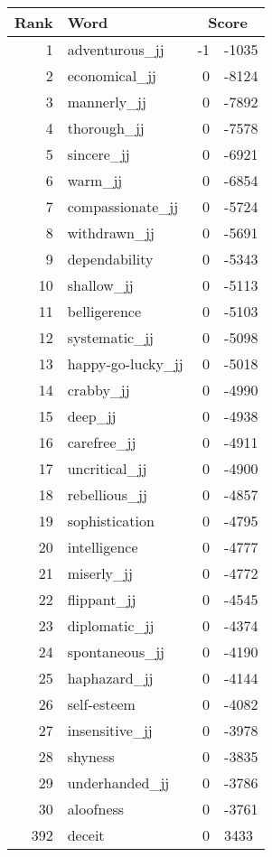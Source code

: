 \begin{longtable}[!htbp]{| rlr@{.}l |}
    \hline
    \textbf{Rank} & \textbf{Word} & \multicolumn{2}{c|}{\textbf{Score}} \\
    \hline
    \endhead
    1 & adventurous\_jj & -1 & -1035 \\
    2 & economical\_jj & 0 & -8124 \\
    3 & mannerly\_jj & 0 & -7892 \\
    4 & thorough\_jj & 0 & -7578 \\
    5 & sincere\_jj & 0 & -6921 \\
    6 & warm\_jj & 0 & -6854 \\
    7 & compassionate\_jj & 0 & -5724 \\
    8 & withdrawn\_jj & 0 & -5691 \\
    9 & dependability & 0 & -5343 \\
    10 & shallow\_jj & 0 & -5113 \\
    11 & belligerence & 0 & -5103 \\
    12 & systematic\_jj & 0 & -5098 \\
    13 & happy-go-lucky\_jj & 0 & -5018 \\
    14 & crabby\_jj & 0 & -4990 \\
    15 & deep\_jj & 0 & -4938 \\
    16 & carefree\_jj & 0 & -4911 \\
    17 & uncritical\_jj & 0 & -4900 \\
    18 & rebellious\_jj & 0 & -4857 \\
    19 & sophistication & 0 & -4795 \\
    20 & intelligence & 0 & -4777 \\
    21 & miserly\_jj & 0 & -4772 \\
    22 & flippant\_jj & 0 & -4545 \\
    23 & diplomatic\_jj & 0 & -4374 \\
    24 & spontaneous\_jj & 0 & -4190 \\
    25 & haphazard\_jj & 0 & -4144 \\
    26 & self-esteem & 0 & -4082 \\
    27 & insensitive\_jj & 0 & -3978 \\
    28 & shyness & 0 & -3835 \\
    29 & underhanded\_jj & 0 & -3786 \\
    30 & aloofness & 0 & -3761 \\
    392 & deceit & 0 & 3433 \\

\end{longtable}
